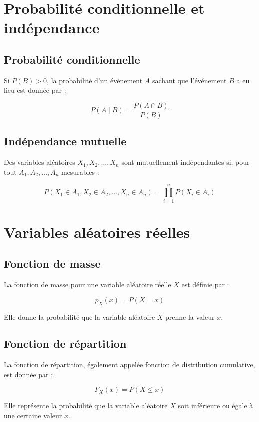 \documentclass{article}
\begin{document}
\section{Probabilité conditionnelle et indépendance}

\subsection{Probabilité conditionnelle}

Si $P(B) > 0$, la probabilité d'un événement $A$ sachant que l'événement $B$ a eu lieu est donnée par :

\[
P(A \mid B) = \frac{P(A \cap B)}{P(B)}
\]

\subsection{Indépendance mutuelle}

Des variables aléatoires $X_1, X_2, \dotsc, X_n$ sont mutuellement indépendantes si, pour tout $A_1, A_2, \dotsc, A_n$ mesurables :

\[
P(X_1 \in A_1, X_2 \in A_2, \dotsc, X_n \in A_n) = \prod_{i=1}^n P(X_i \in A_i)
\]

\section{Variables aléatoires réelles}

\subsection{Fonction de masse}

La fonction de masse pour une variable aléatoire réelle $X$ est définie par :

\[
p_X(x) = P(X = x)
\]

Elle donne la probabilité que la variable aléatoire $X$ prenne la valeur $x$.

\subsection{Fonction de répartition}

La fonction de répartition, également appelée fonction de distribution cumulative, est donnée par :

\[
F_X(x) = P(X \leq x)
\]

Elle représente la probabilité que la variable aléatoire $X$ soit inférieure ou égale à une certaine valeur $x$.
\end{document}
